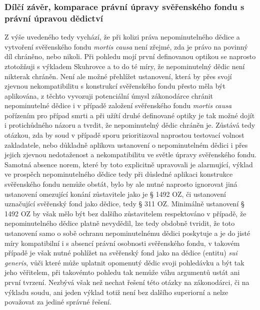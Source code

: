 \documentclass{article}
\begin{document}
\subsubsection{Dílčí závěr, komparace právní úpravy svěřenského fondu s právní úpravou dědictví}

Z výše uvedeného tedy vychází, že při kolizi práva nepominutelného dědice a vytvoření svěřenského fondu \textit{mortis causa} není zřejmé, zda je právo na povinný díl chráněno, nebo nikoli. Při pohledu mojí první definovanou optikou se naprosto ztotožňuji s výkladem Skuhrovce a to do té míry, že nepominutelný dědic není nikterak chráněn. Není ale možné přehlížet ustanovení, která by přes svojí zjevnou nekompatibilitu s konstrukcí svěřenského fondu přesto měla být aplikována, z těchto vyvozuji potenciální úmysl zákonodárce chránit nepominutelné dědice i v případě založení svěřenského fondu \textit{mortis causa} pořízením pro případ smrti a při užítí druhé definované optiky je tak možné dojít i protichůdného názoru a tvrdit, že nepominutelný dědic chráněn je. Zůstává tedy otázkou, zda by soud v případě sporu prioritizoval naprostou testovací volnost zakladatele, nebo důkladně aplikova ustanovení o nepominutelném dědici i přes jejich zjevnou nedotaženost a nekompatibilitu ve světle úpravy svěřenského fondu. Samotná absence norem, které by toto explicitně upravovali je alarmující, výklad ve prospěch nepominutelného dědice tedy při důsledné aplikaci konstrukce svěřenského fondu nemůže obstát, bylo by ale nutné naprosto ignorovat jiná ustanovení omezující konání zůstavitele jako je § 1492 OZ, či ustanovení uznačující svěřenský fond jako dědice, tedy § 311 OZ. Minimálně ustanovení § 1492 OZ by však mělo být bez dalšího zůstavitelem respektováno v případě, že nepominutelného dědice platně nevydědil, lze tedy obdobně tvridit, že toto ustanovení samo o sobě ochranu nepominutelnému dědici poskytuje a je do jisté míry kompatibilní i s absencí právní osobnosti svěřenského fondu, v takovém případě je však nutné pohlížet na svěřenský fond jako na dědice (entitu) \textit{sui generis}, vůči které může uplatnit opomenutý dědic svoji pohledávku a být tak jeho věřitelem, při takovémto pohledu tak nemůže váhu argumentů ustát ani první tvrzení. Nezbývá však než nechat řešení této otázky na zákonodárci, či na výkladu soudu, ani jeden výklad totiž není bez dalšího superiorní a nelze považovat za jediné správné řešení.\\
\end{document}
